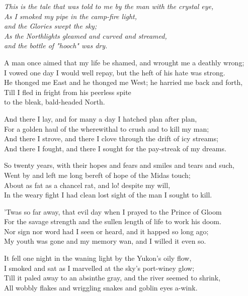 
\begin{poemblock}
\textit{
This is the tale that was told to me by the man with the crystal eye,\\
\idt As I smoked my pipe in the camp-fire light,\\
and the Glories swept the sky;\\
\idt As the Northlights gleamed and curved and streamed,\\
and the bottle of "hooch" was dry.
}

A man once aimed that my life be shamed, and wrought me a deathly wrong;\\
I vowed one day I would well repay, but the heft of his hate was strong.\\
He thonged me East and he thonged me West; he harried me back and forth,\\
Till I fled in fright from his peerless spite\\
\idt to the bleak, bald-headed North.

And there I lay, and for many a day I hatched plan after plan,\\
For a golden haul of the wherewithal to crush and to kill my man;\\
And there I strove, and there I clove through the drift of icy streams;\\
And there I fought, and there I sought for the pay-streak of my dreams.

So twenty years, with their hopes and fears and smiles and tears and such,\\
Went by and left me long bereft of hope of the Midas touch;\\
About as fat as a chancel rat, and lo! despite my will,\\
In the weary fight I had clean lost sight of the man I sought to kill.

'Twas so far away, that evil day when I prayed to the Prince of Gloom\\
For the savage strength and the sullen length of life to work his doom.\\
Nor sign nor word had I seen or heard, and it happed so long ago;\\
My youth was gone and my memory wan, and I willed it even so.

It fell one night in the waning light by the Yukon's oily flow,\\
I smoked and sat as I marvelled at the sky's port-winey glow;\\
Till it paled away to an absinthe gray, and the river seemed to shrink,\\
All wobbly flakes and wriggling snakes and goblin eyes a-wink.


\end{poemblock}
